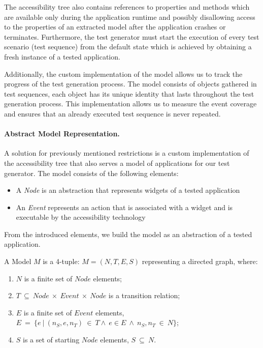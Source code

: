 The accessibility tree also contains references to properties and methods which are available only during the application runtime and possibly disallowing access to the properties of an extracted model after the application crashes or terminates. Furthermore, the test generator must start the execution of every test scenario (test sequence) from the default state which is achieved by obtaining a fresh instance of a tested application.

Additionally, the custom implementation of the model allows us to track the progress of the test generation process. The model consists of objects gathered in test sequences, each object has its unique identity that lasts throughout the test generation process. This implementation allows us to measure the event coverage and ensures that an already executed test sequence is never repeated.

\paragraph{Abstract Model Representation.} A solution for previously mentioned restrictions is a custom implementation of the accessibility tree that also serves a model of applications for our test generator. The model consists of the following elements:

\begin{itemize}
\item A \textit{Node} is an abstraction that represents widgets of a tested application
\item An \textit{Event} represents an action that is associated with a widget and is executable by the accessibility technology
\end{itemize}

From the introduced elements, we build the model as an abstraction of a tested application. 

\theoremstyle{definition}
\begin{definition}
A Model $M$ is a 4-tuple: $M = (N, T, E, S)$ representing a directed graph, where:
\begin{enumerate}
\item $N$ is a finite set of $Node$ elements; 
\item $T\ \subseteq\ Node\ \times \ Event\ \times \ Node$ is a transition relation;
\item $E$ is a finite set of $Event$ elements,  $E\ =\ \{e\ |\ (n_S, e, n_T)\ \in\ T \land \ e \in E \ \land \ n_S,n_T\ \in \ N\}$;
\item $S$ is a set of starting $Node$ elements, $S\ \subseteq\ N$.
\end{enumerate}
\end{definition}

